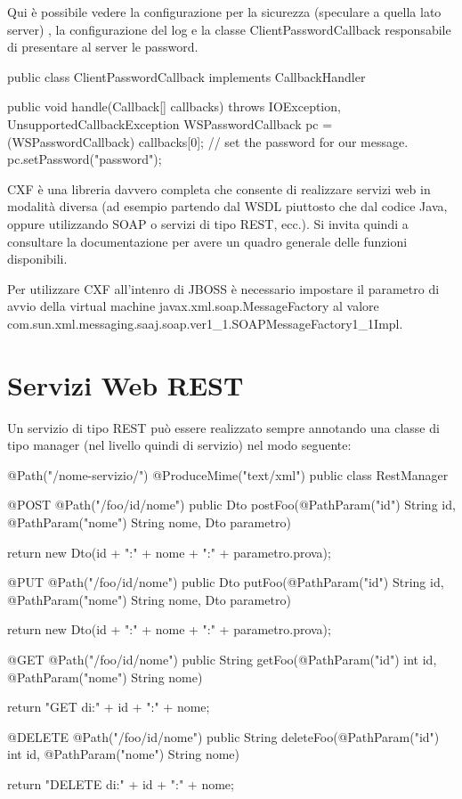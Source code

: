 Qui è possibile vedere la configurazione per la sicurezza (speculare a quella lato server) , la configurazione del log e la classe  ClientPasswordCallback responsabile di presentare al server le password.

\begin{java}
public class ClientPasswordCallback implements CallbackHandler {

  public void handle(Callback[] callbacks) throws IOException,
      UnsupportedCallbackException {
      WSPasswordCallback pc = (WSPasswordCallback) callbacks[0];
  // set the password for our message.
  pc.setPassword("password");
   }
}
\end{java}


CXF è una libreria davvero completa che consente di realizzare servizi web in modalità diversa (ad esempio partendo dal WSDL piuttosto che dal codice Java, oppure utilizzando SOAP o servizi di tipo REST, ecc.). Si invita quindi a consultare la documentazione per avere un quadro generale delle funzioni disponibili.

\begin{nota}
Per utilizzare CXF all'intenro di JBOSS è necessario impostare il parametro di avvio della virtual machine javax.xml.soap.MessageFactory al valore com.sun.xml.messaging.saaj.soap.ver1\_1.SOAPMessageFactory1\_1Impl.
\end{nota}

\section{Servizi Web REST}
Un servizio di tipo REST può essere realizzato sempre annotando una classe di tipo manager (nel livello quindi di servizio) nel modo seguente:

\begin{java}
@Path("/nome-servizio/")
@ProduceMime("text/xml")
public class RestManager {

  @POST @Path("/foo/{id}/{nome}")
  public Dto postFoo(@PathParam("id") String id, @PathParam("nome") String nome, Dto parametro) {

    return new Dto(id + ":" + nome + ":" + parametro.prova);
  }

  @PUT @Path("/foo/{id}/{nome}")
  public Dto putFoo(@PathParam("id") String id, @PathParam("nome") String nome, Dto parametro) {

    return new Dto(id + ":" + nome + ":" + parametro.prova);
  }

  @GET @Path("/foo/{id}/{nome}")
  public String getFoo(@PathParam("id") int id, @PathParam("nome") String nome) {

    return "GET di:" + id + ":" + nome;
  }

  @DELETE @Path("/foo/{id}/{nome}")
  public String deleteFoo(@PathParam("id") int id, @PathParam("nome") String nome) {

    return "DELETE di:" + id + ":" + nome;
  }
  
}
\end{java}


